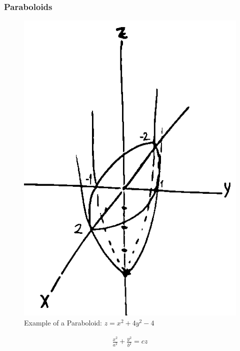 \documentclass{article}
\begin{document}
\subsubsection{Paraboloids}
\begin{figure}[h]
  \includegraphics[scale=0.5]{paraboloid}
  \centering
  \caption{Example of a Paraboloid: $z = x^2 + 4y^2 - 4$}
  \label{fig:paraboloid}
\end{figure}
\begin{align}
  \frac{x^2}{a^2} + \frac{y^2}{b^2} = cz
\end{align}
\end{document}
